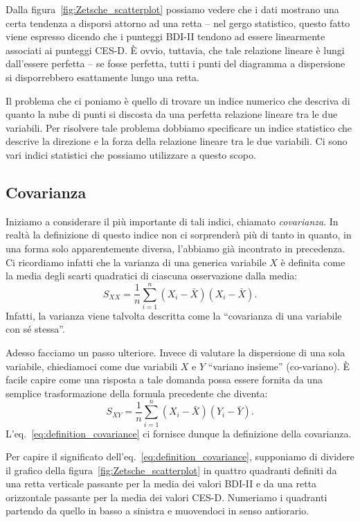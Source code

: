 Dalla figura~\ref{fig:Zetsche_scatterplot} possiamo vedere che i dati mostrano una certa tendenza a disporsi attorno ad una retta -- nel gergo statistico, questo fatto viene espresso dicendo che i punteggi BDI-II tendono ad essere linearmente associati ai punteggi CES-D.
È ovvio, tuttavia, che tale relazione lineare è lungi dall'essere perfetta -- se  fosse perfetta, tutti i punti del diagramma a dispersione si disporrebbero esattamente lungo una retta.

Il problema che ci poniamo è quello di trovare un indice numerico che descriva di quanto la nube di punti si discosta da una perfetta relazione lineare tra le due variabili.
Per risolvere tale problema dobbiamo specificare un indice statistico che descrive la direzione e la forza della relazione lineare tra le due variabili.
Ci sono vari indici statistici che possiamo utilizzare a questo scopo.


\subsection{Covarianza}

Iniziamo a considerare il più importante di tali indici, chiamato \emph{covarianza}.
In realtà la definizione di questo indice non ci sorprenderà più di tanto in quanto, in una forma solo apparentemente diversa, l'abbiamo già incontrato in precedenza.
Ci ricordiamo infatti che la varianza di una  generica variabile $X$ è definita come la media degli scarti quadratici di ciascuna osservazione dalla media:
\begin{equation*}
S_{XX} = \frac{1}{n} \sum_{i=1}^n(X_i - \bar{X}) (X_i - \bar{X}).
\end{equation*}
Infatti, la varianza viene talvolta descritta come la \enquote{covarianza di una variabile con sé stessa}.

Adesso facciamo un passo ulteriore.
Invece di valutare la dispersione di una sola variabile, chiediamoci come due variabili $X$ e $Y$ \enquote{variano insieme} (co-variano).
È facile capire come una risposta a tale domanda possa essere fornita da una semplice trasformazione della formula precedente che diventa:
\begin{equation}
S_{XY} = \frac{1}{n} \sum_{i=1}^n(X_i - \bar{X}) (Y_i - \bar{Y}).
\label{eq:definition_covariance}
\end{equation}
L'eq.~\eqref{eq:definition_covariance} ci fornisce dunque la definizione della covarianza.

Per capire il significato dell'eq.~\eqref{eq:definition_covariance}, supponiamo di dividere il grafico della figura~\ref{fig:Zetsche_scatterplot} in quattro quadranti definiti da una retta verticale passante per la media dei valori BDI-II e da una retta orizzontale passante per la media dei valori CES-D.
Numeriamo i quadranti partendo da quello in basso a sinistra e muovendoci in senso antiorario.

